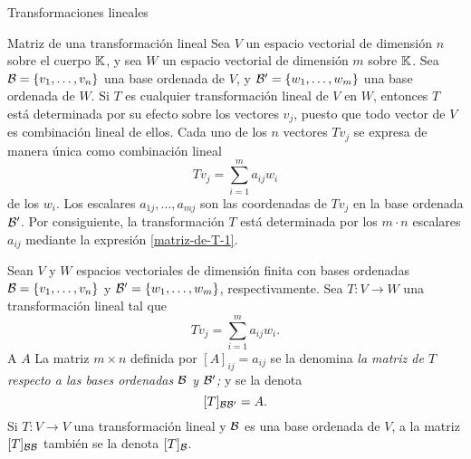 \begin{chapter}{Transformaciones lineales}
        \begin{section}{Matriz de una transformaci\'on lineal}\label{seccion-matriz-de-una-tl}
            Sea $V$ un espacio vectorial de dimensión $n$ sobre el cuerpo $\mathbb K$, y sea $W$ un espacio vectorial de dimensión $m$ sobre $\mathbb K$. Sea $\mathcal{B} = \{v_1,\ldots,v_n\}$ una base ordenada de $V$, y $\mathcal{B}' = \{w_1,\ldots,w_m\}$ una base ordenada de $W$. Si $T$ es cualquier 		transformación lineal de $V$ en $W$, entonces $T$ está determinada por su efecto sobre los vectores $v_j$, puesto que todo vector de $V$ es combinación lineal de ellos. Cada uno de los $n$ vectores $Tv_j$ se expresa de manera única 	como combinación lineal
            \begin{equation}\label{matriz-de-T-1}
                Tv_j = \sum_{i=1}^{m} a_{ij} w_i
            \end{equation}
            de los $w_i$. Los escalares $a_{1j},\ldots,a_{mj}$ son las coordenadas de $Tv_j$ en la base ordenada $\mathcal{B}'$. Por consiguiente, la transformación $T$ está determinada por los
            $m\cdot n$ escalares $a_{ij}$ mediante la expresión \eqref{matriz-de-T-1}. 
            
            \begin{definicion} Sean $V$ y $W$ espacios vectoriales de dimensión finita con bases ordenadas $\mathcal{B} = \{v_1,\ldots,v_n\}$  y $\mathcal{B}' = \{w_1,\ldots,w_m\}$, respectivamente. Sea $T: V \to W$ una transformación lineal tal que 
                \begin{equation*}\label{matriz-de-T-1}
                    Tv_j = \sum_{i=1}^{m} a_{ij} w_i.
                \end{equation*}
                A  $A$  La matriz $m \times n$  definida por $[A]_{ij} = a_{ij}$ se la  denomina \textit{la matriz de $T$ respecto a las bases ordenadas $\mathcal{B}$ y $\mathcal{B}'$;} y se la denota 
                $$
                [T]_{\mathcal{B} \mathcal{B}'} = A .
                $$
                Si $T: V \to V$ una transformación lineal y $\mathcal{B}$ es una base ordenada de $V$,  a la matriz $[T]_{\mathcal{B} \mathcal{B}}$ también se la denota $[T]_{\mathcal{B}}$.
            \end{definicion}
            

\end{section}
\end{chapter}
